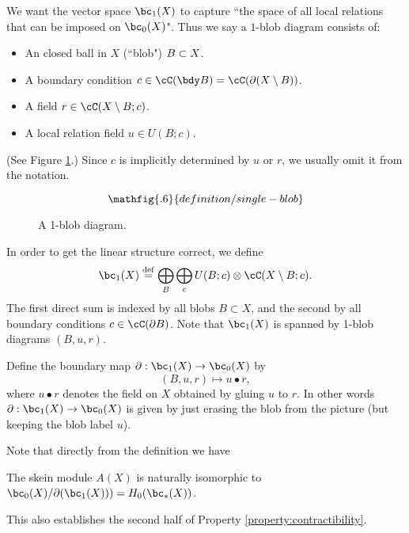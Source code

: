 We want the vector space $\bc_1(X)$ to capture 
``the space of all local relations that can be imposed on $\bc_0(X)$".
Thus we say  a $1$-blob diagram consists of:
\begin{itemize}
\item An closed ball in $X$ (``blob") $B \subset X$.
\item A boundary condition $c \in \cC(\bdy B) = \cC(\bd(X \setmin B))$.
\item A field $r \in \cC(X \setmin B; c)$.
\item A local relation field $u \in U(B; c)$.
\end{itemize}
(See Figure \ref{blob1diagram}.) Since $c$ is implicitly determined by $u$ or $r$, we usually omit it from the notation.
\begin{figure}[t]\begin{equation*}
\mathfig{.6}{definition/single-blob}
\end{equation*}\caption{A 1-blob diagram.}\label{blob1diagram}\end{figure}
In order to get the linear structure correct, we define
\[
	\bc_1(X) \deq \bigoplus_B \bigoplus_c U(B; c) \otimes \lf(X \setmin B; c) .
\]
The first direct sum is indexed by all blobs $B\subset X$, and the second
by all boundary conditions $c \in \cC(\bd B)$.
Note that $\bc_1(X)$ is spanned by 1-blob diagrams $(B, u, r)$.

Define the boundary map $\bd : \bc_1(X) \to \bc_0(X)$ by 
\[ 
	(B, u, r) \mapsto u\bullet r, 
\]
where $u\bullet r$ denotes the field on $X$ obtained by gluing $u$ to $r$.
In other words $\bd : \bc_1(X) \to \bc_0(X)$ is given by
just erasing the blob from the picture
(but keeping the blob label $u$).

Note that directly from the definition we have
\begin{thm}
\label{thm:skein-modules}
The skein module $A(X)$ is naturally isomorphic to $\bc_0(X)/\bd(\bc_1(X))) = H_0(\bc_*(X))$.
\end{thm}
This also establishes the second 
half of Property \ref{property:contractibility}.

